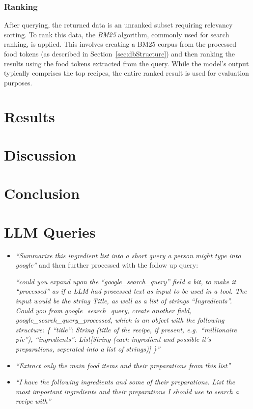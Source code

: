 \documentclass[11pt]{article}
\begin{document}
\subsubsection{Ranking}
After querying, the returned data is an unranked subset requiring relevancy
sorting.
To rank this data, the \emph{BM25} algorithm, commonly used for search ranking,
is applied.
This involves creating a BM25 corpus from the processed food tokens (as
described in Section~\ref{sec:dbStructure}) and then ranking the results using
the food tokens extracted from the query.
While the model's output typically comprises the top recipes, the entire ranked
result is used for evaluation purposes.

\section{Results}
\section{Discussion}
\section{Conclusion}



\appendix
\section{LLM Queries}\label{app:llm}
\begin{itemize}
\item \emph{``Summarize this ingredient list into a short query a person might type
    into google''} and then further processed with the follow up query:

    \emph{``could you expand upon the “google\_search\_query” field a bit, to make it “processed” as if a LLM had processed text as input to be used in a tool.
        The input would be the string Title, as well as a list of strings “Ingredients”.
        Could you from google\_search\_query, create another field,
        google\_search\_query\_processed, which is an object with the following structure:
\{
“title”: String (title of the recipe, if present, e.g.\ ``millionaire pie''),
“ingredients”: List[String (each ingredient and possible it’s preparations, seperated into a list of strings)]
\}''}
\item \emph{``Extract only the main food items and their preparations from
    this list''}
\item \emph{``I have the following ingredients and some of their
        preparations. List the most important ingredients and their
    preparations I should use to search a recipe with''} 
\end{itemize}
\end{document}
